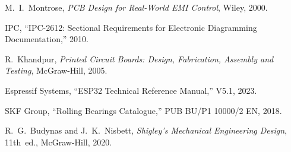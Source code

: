\begin{enumerate}[label={[\arabic*]},leftmargin=2em]
\item M.~I.~Montrose, \emph{PCB Design for Real-World EMI Control}, Wiley, 2000.
\item IPC, ``IPC-2612: Sectional Requirements for Electronic Diagramming Documentation,'' 2010. \label{ipc2612}
\item R.~Khandpur, \emph{Printed Circuit Boards: Design, Fabrication, Assembly and Testing}, McGraw-Hill, 2005.
\item Espressif Systems, ``ESP32 Technical Reference Manual,'' V5.1, 2023.
\item SKF Group, ``Rolling Bearings Catalogue,'' PUB BU/P1 10000/2 EN, 2018.
\item R.~G.~Budynas and J.~K.~Nisbett, \emph{Shigley's Mechanical Engineering Design}, 11th~ed., McGraw-Hill, 2020.
\end{enumerate}

\printindex



